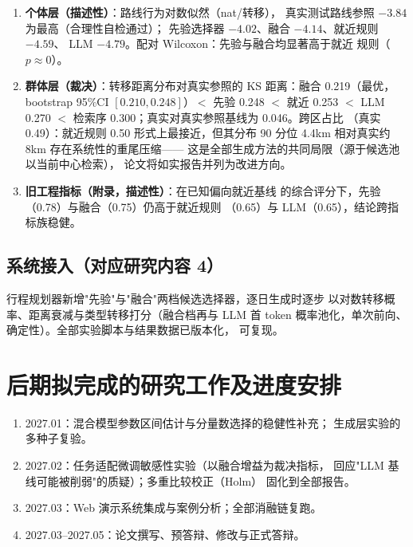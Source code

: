 \begin{enumerate}
  \item \textbf{个体层（描述性）}：路线行为对数似然（nat/转移），
        真实测试路线参照 $-3.84$ 为最高（合理性自检通过）；
        先验选择器 $-4.02$、融合 $-4.14$、就近规则 $-4.59$、
        LLM $-4.79$。配对 Wilcoxon：先验与融合均显著高于就近
        规则（$p\approx0$）。
  \item \textbf{群体层（裁决）}：转移距离分布对真实参照的 KS
        距离：融合 0.219（最优，bootstrap 95\%CI $[0.210,
        0.248]$）$<$ 先验 0.248 $<$ 就近 0.253 $<$ LLM 0.270
        $<$ 检索序 0.300；真实对真实参照基线为 0.046。跨区占比
        （真实 0.49）：就近规则 0.50 形式上最接近，但其分布
        90 分位 4.4km 相对真实约 8km 存在系统性的重尾压缩——
        这是全部生成方法的共同局限（源于候选池以当前中心检索），
        论文将如实报告并列为改进方向。
  \item \textbf{旧工程指标（附录，描述性）}：在已知偏向就近基线
        的综合评分下，先验（0.78）与融合（0.75）仍高于就近规则
        （0.65）与 LLM（0.65），结论跨指标族稳健。
\end{enumerate}

\subsection{系统接入（对应研究内容 4）}

行程规划器新增"先验"与"融合"两档候选选择器，逐日生成时逐步
以对数转移概率、距离衰减与类型转移打分（融合档再与 LLM 首 token
概率池化，单次前向、确定性）。全部实验脚本与结果数据已版本化，
可复现。

\section{后期拟完成的研究工作及进度安排}

\begin{enumerate}
  \item 2027.01：混合模型参数区间估计与分量数选择的稳健性补充；
        生成层实验的多种子复验。
  \item 2027.02：任务适配微调敏感性实验（以融合增益为裁决指标，
        回应"LLM 基线可能被削弱"的质疑）；多重比较校正（Holm）
        固化到全部报告。
  \item 2027.03：Web 演示系统集成与案例分析；全部消融链复跑。
  \item 2027.03--2027.05：论文撰写、预答辩、修改与正式答辩。
\end{enumerate}

